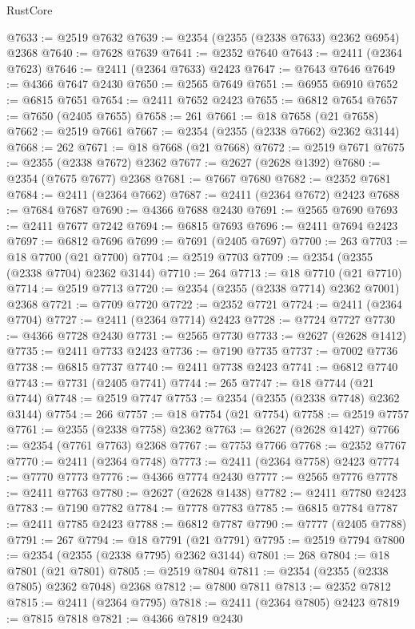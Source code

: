 \begin{lexlean}{RustCore}
\begin{coremodule}
@7633 := @2519 @7632
@7639 := @2354 (@2355 (@2338 @7633) @2362 @6954) @2368
@7640 := @7628 @7639
@7641 := @2352 @7640
@7643 := @2411 (@2364 @7623)
@7646 := @2411 (@2364 @7633) @2423
@7647 := @7643 @7646
@7649 := @4366 @7647 @2430
@7650 := @2565 @7649
@7651 := @6955 @6910
@7652 := @6815 @7651
@7654 := @2411 @7652 @2423
@7655 := @6812 @7654
@7657 := @7650 (@2405 @7655)
@7658 := 261
@7661 := @18 @7658 (@21 @7658)
@7662 := @2519 @7661
@7667 := @2354 (@2355 (@2338 @7662) @2362 @3144)
@7668 := 262
@7671 := @18 @7668 (@21 @7668)
@7672 := @2519 @7671
@7675 := @2355 (@2338 @7672) @2362
@7677 := @2627 (@2628 @1392)
@7680 := @2354 (@7675 @7677) @2368
@7681 := @7667 @7680
@7682 := @2352 @7681
@7684 := @2411 (@2364 @7662)
@7687 := @2411 (@2364 @7672) @2423
@7688 := @7684 @7687
@7690 := @4366 @7688 @2430
@7691 := @2565 @7690
@7693 := @2411 @7677 @7242
@7694 := @6815 @7693
@7696 := @2411 @7694 @2423
@7697 := @6812 @7696
@7699 := @7691 (@2405 @7697)
@7700 := 263
@7703 := @18 @7700 (@21 @7700)
@7704 := @2519 @7703
@7709 := @2354 (@2355 (@2338 @7704) @2362 @3144)
@7710 := 264
@7713 := @18 @7710 (@21 @7710)
@7714 := @2519 @7713
@7720 := @2354 (@2355 (@2338 @7714) @2362 @7001) @2368
@7721 := @7709 @7720
@7722 := @2352 @7721
@7724 := @2411 (@2364 @7704)
@7727 := @2411 (@2364 @7714) @2423
@7728 := @7724 @7727
@7730 := @4366 @7728 @2430
@7731 := @2565 @7730
@7733 := @2627 (@2628 @1412)
@7735 := @2411 @7733 @2423
@7736 := @7190 @7735
@7737 := @7002 @7736
@7738 := @6815 @7737
@7740 := @2411 @7738 @2423
@7741 := @6812 @7740
@7743 := @7731 (@2405 @7741)
@7744 := 265
@7747 := @18 @7744 (@21 @7744)
@7748 := @2519 @7747
@7753 := @2354 (@2355 (@2338 @7748) @2362 @3144)
@7754 := 266
@7757 := @18 @7754 (@21 @7754)
@7758 := @2519 @7757
@7761 := @2355 (@2338 @7758) @2362
@7763 := @2627 (@2628 @1427)
@7766 := @2354 (@7761 @7763) @2368
@7767 := @7753 @7766
@7768 := @2352 @7767
@7770 := @2411 (@2364 @7748)
@7773 := @2411 (@2364 @7758) @2423
@7774 := @7770 @7773
@7776 := @4366 @7774 @2430
@7777 := @2565 @7776
@7778 := @2411 @7763
@7780 := @2627 (@2628 @1438)
@7782 := @2411 @7780 @2423
@7783 := @7190 @7782
@7784 := @7778 @7783
@7785 := @6815 @7784
@7787 := @2411 @7785 @2423
@7788 := @6812 @7787
@7790 := @7777 (@2405 @7788)
@7791 := 267
@7794 := @18 @7791 (@21 @7791)
@7795 := @2519 @7794
@7800 := @2354 (@2355 (@2338 @7795) @2362 @3144)
@7801 := 268
@7804 := @18 @7801 (@21 @7801)
@7805 := @2519 @7804
@7811 := @2354 (@2355 (@2338 @7805) @2362 @7048) @2368
@7812 := @7800 @7811
@7813 := @2352 @7812
@7815 := @2411 (@2364 @7795)
@7818 := @2411 (@2364 @7805) @2423
@7819 := @7815 @7818
@7821 := @4366 @7819 @2430

\end{coremodule}
\end{lexlean}

